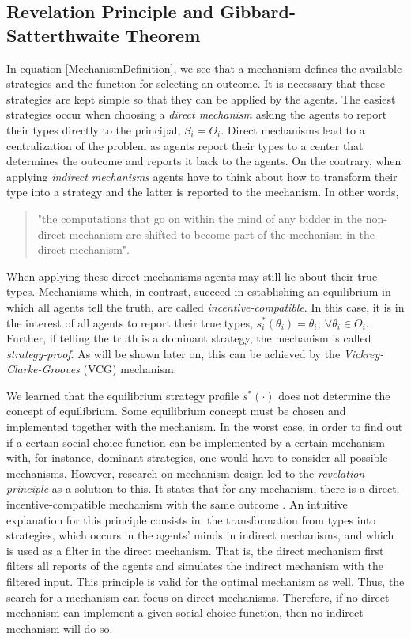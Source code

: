 \subsection{Revelation Principle and Gibbard-Satterthwaite Theorem}
In equation \ref{MechanismDefinition}, we see that a mechanism
defines the available strategies and the function for selecting an
outcome. It is necessary that these strategies are kept simple so
that they can be applied by the agents. The easiest strategies
occur when choosing a \emph{direct mechanism} asking the agents to
report their types directly to the principal, $S_i=\Theta_i$.
Direct mechanisms lead to a centralization of the problem as
agents report their types to a center that determines the outcome
and reports it back to the agents. On the contrary, when applying
\emph{indirect mechanisms} agents have to think about how to
transform their type into a strategy and the latter is reported to
the mechanism. In other words,
\begin{quote} "the computations that go on within the mind of any
bidder in the non-direct mechanism are shifted to become part of
the mechanism in the direct mechanism". \textcite[p.~712]{McMc87}
\end{quote}
When applying these direct mechanisms agents may still lie about
their true types. Mechanisms which, in contrast, succeed in
establishing an equilibrium in which all agents tell the truth,
are called \emph{incentive-compatible}. In this case, it is in the
interest of all agents to report their true types,
$s^\ast_i(\theta_i) = \theta_i,~\forall \theta_i \in \Theta_i$.
Further, if telling the truth is a dominant strategy, the
mechanism is called \emph{strategy-proof}. As will be shown later
on, this can be achieved by the \emph{Vickrey-Clarke-Grooves}
(VCG) mechanism.

We learned that the equilibrium strategy profile $s^\ast(\cdot)$
does not determine the concept of equilibrium. Some equilibrium
concept must be chosen and implemented together with the mechanism. In the
worst case, in order to find out if a certain social choice
function can be implemented by a certain mechanism with, for
instance, dominant strategies, one would have to consider all
possible mechanisms. However, research on mechanism design led to
the \emph{revelation principle} as a solution to this. It states
that for any mechanism, there is a direct, incentive-compatible
mechanism with the same outcome \parencite{McMc87}. An intuitive
explanation for this principle consists in: the transformation
from types into strategies, which occurs in the agents' minds in
indirect mechanisms, and which is used as a filter in the direct mechanism.
That is, the direct mechanism first filters all reports of the
agents and simulates the indirect mechanism with the filtered
input. This principle is valid for the optimal mechanism as well.
Thus, the search for a mechanism can focus on direct
mechanisms. Therefore, if no direct mechanism can implement a
given social choice function, then no indirect mechanism will do
so.

